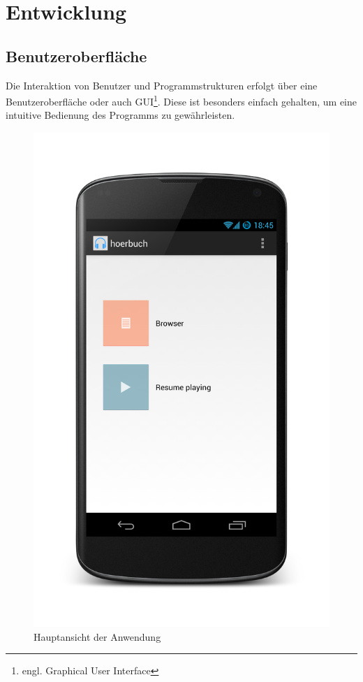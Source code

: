 \section{Entwicklung}

\subsection{Benutzeroberfläche}

Die Interaktion von Benutzer und Programmstrukturen erfolgt über eine Benutzeroberfläche oder auch GUI\footnote{engl. Graphical User Interface}. Diese ist besonders einfach gehalten, um eine intuitive Bedienung des Programms zu gewährleisten.

\begin{figure}[h!t]
\begin{center}
\includegraphics[scale=.2]{images/mainscreen}
\caption{Hauptansicht der Anwendung}
\label{mainscreen}
\end{center}
\end{figure}

